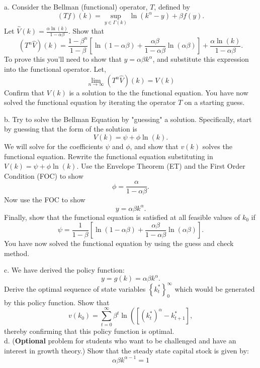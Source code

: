 \documentclass[11pt]{extarticle}
\theoremstyle{plain}
\theoremstyle{definition}
\begin{document}
\vspace{5mm}
\noindent
a. Consider the Bellman (functional) operator, $T$, defined by
$$
(T f)(k)=\sup _{y \in \Gamma(k)} \ln \left(k^\alpha-y\right)+\beta f(y) .
$$
Let $\hat{V}(k)=\frac{\alpha \ln (k)}{1-\alpha \beta}$. Show that
$$
\left(T^n \hat{V}\right)(k)=\frac{1-\beta^n}{1-\beta}\left[\ln (1-\alpha \beta)+\frac{\alpha \beta}{1-\alpha \beta} \ln (\alpha \beta)\right]+\frac{\alpha \ln (k)}{1-\alpha \beta} .
$$
To prove this you'll need to show that $y=\alpha \beta k^\alpha$, and substitute this expression into the functional operator. Let,
$$
\lim _{n \rightarrow \infty}\left(T^n \hat{V}\right)(k)=V(k)
$$
Confirm that $V(k)$ is a solution to the the functional equation. You have now solved the functional equation by iterating the operator $T$ on a starting guess.


\vspace{5mm}
\noindent
b. Try to solve the Bellman Equation by "guessing" a solution. Specifically, start by guessing that the form of the solution is
$$
V(k)=\psi+\phi \ln (k) .
$$
We will solve for the coefficients $\psi$ and $\phi$, and show that $v(k)$ solves the functional equation. Rewrite the functional equation substituting in $V(k)=\psi+\phi \ln (k)$. Use the Envelope Theorem (ET) and the First Order Condition (FOC) to show
$$
\phi=\frac{\alpha}{1-\alpha \beta} .
$$
Now use the FOC to show
$$
y=\alpha \beta k^\alpha .
$$
Finally, show that the functional equation is satisfied at all feasible values of $k_0$ if
$$
\psi=\frac{1}{1-\beta}\left[\ln (1-\alpha \beta)+\frac{\alpha \beta}{1-\alpha \beta} \ln (\alpha \beta)\right] .
$$
You have now solved the functional equation by using the guess and check method.


\vspace{5mm}
\noindent
c. We have derived the policy function:
$$
y=g(k)=\alpha \beta k^\alpha .
$$
Derive the optimal sequence of state variables $\left\{k_t^*\right\}_0^{\infty}$ which would be generated by this policy function. Show that
$$
v\left(k_0\right)=\sum_{t=0}^{\infty} \beta^t \ln \left(\left[\left(k_t^*\right)^\alpha-k_{t+1}^*\right],\right.
$$
thereby confirming that this policy function is optimal. \\


\vspace{5mm}
\noindent
d. (\textbf{Optional} problem for students who want to be challenged and have an interest in growth theory.) Show that the steady state capital stock is given by:
$$
\alpha \beta k^{\alpha-1}=1
$$
\end{document}
